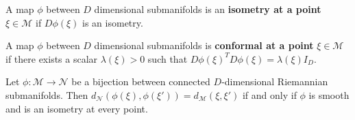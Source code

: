 \begin{definition}{\citet{Lee2018-rm}}
\label{def:isometric_at_a_point}
A map $\phi$ between $D$ dimensional submanifolds is an \textbf{isometry at a point} $\xi \in \mathcal M$ if $D \phi (\xi)$ is an isometry.
\end{definition}

\begin{definition}{\citet{Lee2018-rm}}
\label{def:conformal_at_a_point}
A map $\phi$ between $D$ dimensional submanifolds is \textbf{conformal at a point} $\xi \in \mathcal M$ if there exists a scalar $\lambda(\xi) > 0$ such that ${D \phi (\xi)}^T D \phi (\xi) = \lambda(\xi) I_D$.
\end{definition}

\begin{proposition}{\citet{Lee2018-rm}}
\label{prop:distance_differential_isometry}
Let $\phi:\mathcal M \to \mathcal N$ be a bijection between connected $D$-dimensional Riemannian submanifolds.
Then $d_\mathcal N(\phi(\xi), \phi(\xi')) = d_\mathcal M(\xi, \xi')$ if and only if $\phi$ is smooth and is an isometry at every point.
\end{proposition}

